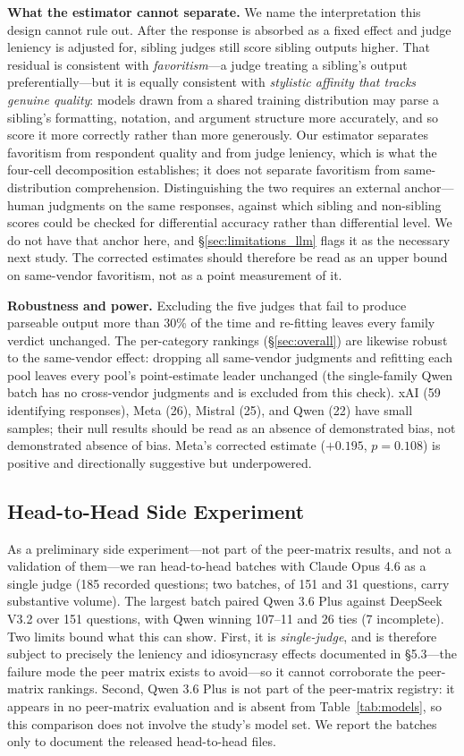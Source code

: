 \documentclass{article}
\begin{document}
\textbf{What the estimator cannot separate.} We name the interpretation this design cannot rule out. After the response is absorbed as a fixed effect and judge leniency is adjusted for, sibling judges still score sibling outputs higher. That residual is consistent with \emph{favoritism}---a judge treating a sibling's output preferentially---but it is equally consistent with \emph{stylistic affinity that tracks genuine quality}: models drawn from a shared training distribution may parse a sibling's formatting, notation, and argument structure more accurately, and so score it more correctly rather than more generously. Our estimator separates favoritism from respondent quality and from judge leniency, which is what the four-cell decomposition establishes; it does not separate favoritism from same-distribution comprehension. Distinguishing the two requires an external anchor---human judgments on the same responses, against which sibling and non-sibling scores could be checked for differential accuracy rather than differential level. We do not have that anchor here, and \S\ref{sec:limitations_llm} flags it as the necessary next study. The corrected estimates should therefore be read as an upper bound on same-vendor favoritism, not as a point measurement of it.

\textbf{Robustness and power.} Excluding the five judges that fail to produce parseable output more than 30\% of the time and re-fitting leaves every family verdict unchanged. The per-category rankings (\S\ref{sec:overall}) are likewise robust to the same-vendor effect: dropping all same-vendor judgments and refitting each pool leaves every pool's point-estimate leader unchanged (the single-family Qwen batch has no cross-vendor judgments and is excluded from this check). xAI (59 identifying responses), Meta (26), Mistral (25), and Qwen (22) have small samples; their null results should be read as an absence of demonstrated bias, not demonstrated absence of bias. Meta's corrected estimate ($+0.195$, $p = 0.108$) is positive and directionally suggestive but underpowered.

\subsection{Head-to-Head Side Experiment}
\label{sec:h2h}

As a preliminary side experiment---not part of the peer-matrix results, and not a validation of them---we ran head-to-head batches with Claude Opus 4.6 as a single judge (185 recorded questions; two batches, of 151 and 31 questions, carry substantive volume). The largest batch paired Qwen 3.6 Plus against DeepSeek V3.2 over 151 questions, with Qwen winning 107--11 and 26 ties (7 incomplete). Two limits bound what this can show. First, it is \emph{single-judge}, and is therefore subject to precisely the leniency and idiosyncrasy effects documented in \S5.3---the failure mode the peer matrix exists to avoid---so it cannot corroborate the peer-matrix rankings. Second, Qwen 3.6 Plus is not part of the peer-matrix registry: it appears in no peer-matrix evaluation and is absent from Table~\ref{tab:models}, so this comparison does not involve the study's model set. We report the batches only to document the released head-to-head files.
\end{document}
